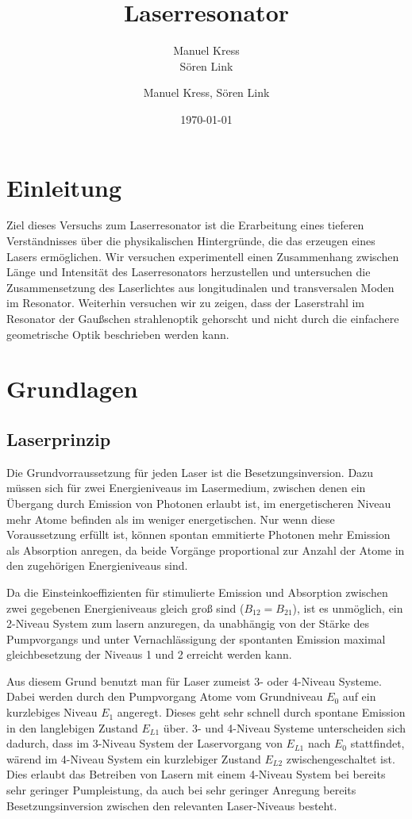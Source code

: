 \documentclass[bigchapter,colorback,accentcolor=tud4b,linedtoc,11pt]{tudreport}
\title{Laserresonator}
\subtitle{Manuel Kress  \\Sören Link}
\author{Manuel Kress, Sören Link}
\date{\today}
\numberwithin{equation}{subsection}
\begin{document}

\maketitle

\tableofcontents


\chapter{Einleitung}
Ziel dieses Versuchs zum Laserresonator ist die Erarbeitung eines tieferen Verständnisses über die physikalischen Hintergründe, die das erzeugen eines Lasers ermöglichen.
Wir versuchen experimentell einen Zusammenhang zwischen Länge und Intensität des Laserresonators herzustellen und untersuchen die Zusammensetzung des Laserlichtes aus longitudinalen und transversalen Moden im Resonator. Weiterhin versuchen wir zu zeigen, dass der Laserstrahl im Resonator der Gaußschen strahlenoptik gehorscht und nicht durch die einfachere geometrische Optik beschrieben werden kann.
\chapter{Grundlagen}
\section{Laserprinzip}
Die Grundvorraussetzung für jeden Laser ist die Besetzungsinversion. Dazu müssen sich für zwei Energieniveaus im Lasermedium, zwischen denen ein Übergang durch Emission von Photonen erlaubt ist, im energetischeren Niveau mehr Atome befinden als im weniger energetischen. Nur wenn diese Voraussetzung erfüllt ist, können spontan emmitierte Photonen mehr Emission als Absorption anregen, da beide Vorgänge proportional zur Anzahl der Atome in den zugehörigen Energieniveaus sind.

Da die Einsteinkoeffizienten für stimulierte Emission und Absorption zwischen zwei gegebenen Energieniveaus gleich groß sind ($B_{12}=B_{21}$), ist es unmöglich, ein 2-Niveau System zum lasern anzuregen, da unabhängig von der Stärke des Pumpvorgangs und unter Vernachlässigung der spontanten Emission maximal gleichbesetzung der Niveaus 1 und 2 erreicht werden kann.

Aus diesem Grund benutzt man für Laser zumeist 3- oder 4-Niveau Systeme. Dabei werden durch den Pumpvorgang Atome vom Grundniveau $E_0$ auf ein kurzlebiges Niveau $E_1$ angeregt. Dieses geht sehr schnell durch spontane Emission in den langlebigen Zustand $E_{L1}$ über. 3- und 4-Niveau Systeme unterscheiden sich dadurch, dass im 3-Niveau System der Laservorgang von $E_{L1}$ nach $E_{0}$ stattfindet, wärend im 4-Niveau System ein kurzlebiger Zustand $E_{L2}$ zwischengeschaltet ist. Dies erlaubt das Betreiben von Lasern mit einem 4-Niveau System bei bereits sehr geringer Pumpleistung, da auch bei sehr geringer Anregung bereits Besetzungsinversion zwischen den relevanten Laser-Niveaus besteht.
\end{document}
